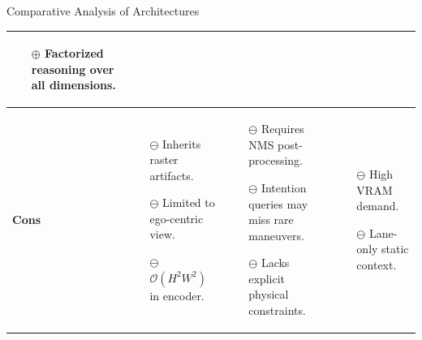 \documentclass[10pt,aspectratio=169]{beamer}
\newcommand{\greenoplus}{\textcolor{mygreen}{\( \oplus \)}}
\newcommand{\redominus}{\textcolor{myred}{\( \ominus \)}}
\begin{document}
\begin{frame}{Comparative Analysis of Architectures}
\begin{table}[ht]
\begin{tabular}{|p{1.9cm}|p{3.9cm}|p{3.9cm}|p{3.9cm}|}
\begin{itemize}
        \item[\greenoplus] Factorized reasoning over all dimensions.
    \end{itemize} \\
    \hline
    \textbf{Cons} &
    \begin{itemize}
        \item[\redominus] Inherits raster artifacts.
        \item[\redominus] Limited to ego-centric view.
        \item[\redominus] \( \mathcal{O}(H^2 W^2) \) in encoder.
    \end{itemize} &
    \begin{itemize}
        \item[\redominus] Requires NMS post-processing.
        \item[\redominus] Intention queries may miss rare maneuvers.
        \item[\redominus] Lacks explicit physical constraints.
    \end{itemize} &
    \begin{itemize}
        \item[\redominus] High VRAM demand.
        \item[\redominus] Lane-only static context.
    \end{itemize} \\
    \hline
\end{tabular}
\end{table}
\end{frame}
\end{document}
